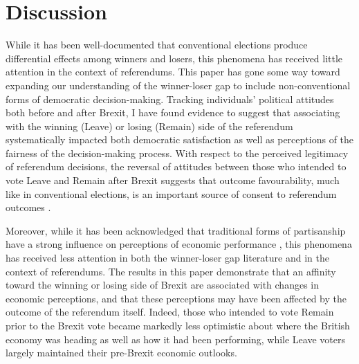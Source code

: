 \documentclass[12pt, letter]{article}
\begin{document}
\singlespacing
\section{Discussion}
\doublespacing


While it has been well-documented that conventional elections produce differential effects among winners and losers, this phenomena has received little attention in the context of referendums. This paper has gone some way toward expanding our understanding of the winner-loser gap to include non-conventional forms of democratic decision-making. Tracking individuals' political attitudes both before and after Brexit, I have found evidence to suggest that associating with the winning (Leave) or losing (Remain) side of the referendum systematically impacted both democratic satisfaction as well as perceptions of the fairness of the decision-making process. With respect to the perceived legitimacy of referendum decisions, the reversal of attitudes between those who intended to vote Leave and Remain after Brexit suggests that outcome favourability, much like in conventional elections, is an important source of consent to referendum outcomes \parencite{nadeau1993accepting}.

Moreover, while it has been acknowledged that traditional forms of partisanship have a strong influence on perceptions of economic performance \parencite{wlezien1997economic, anderson2007end, bartels2002beyond}, this phenomena has received less attention in both the winner-loser gap literature and in the context of referendums. The results in this paper demonstrate that an affinity toward the winning or losing side of Brexit are associated with changes in economic perceptions, and that these perceptions may have been affected by the outcome of the referendum itself. Indeed, those who intended to vote Remain prior to the Brexit vote became markedly less optimistic about where the British economy was heading as well as how it had been performing, while Leave voters largely maintained their pre-Brexit economic outlooks. 
\end{document}
